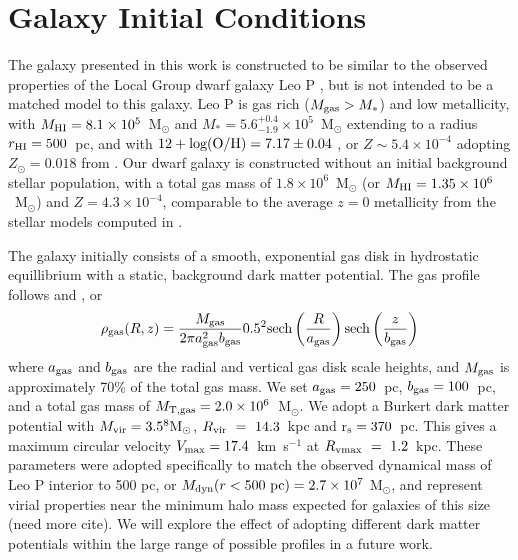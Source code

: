 \documentclass[twocolumn]{aastex61}
\begin{document}
\section{Galaxy Initial Conditions}
\label{sec:IC}
The galaxy presented in this work is constructed to be similar to the observed properties of the Local Group dwarf galaxy Leo P \citep{Giovanelli2013,McQuinn2013,McQuinn2015a,McQuinn2015}, but is not intended to be a matched model to this galaxy. Leo P is gas rich ($M_{\rm gas} > M_{*}$) and low metallicity, with $M_{\rm HI} = 8.1\times 10^{5}$~M$_{\odot}$ and $M_{*} = 5.6^{+0.4}_{-1.9} \times 10^{5}$~M$_{\odot}$ \citep{McQuinn2015a} extending to a radius $r_{\rm HI} = 500$~pc, and with $12 + \rm{log(O/H)} = 7.17 \pm 0.04$ \citep{Skillman2013}, or $Z \sim 5.4\times10^{-4}$ adopting $Z_{\odot} = 0.018$ from \citet{Asplund2009}. Our dwarf galaxy is constructed without an initial background stellar population, with a total gas mass of $1.8 \times 10^{6}$~M$_{\odot}$ (or $M_{\rm HI} = 1.35 \times 10^{6}$~M$_{\odot}$) and $Z = 4.3\times 10^{-4}$, comparable to the average $z = 0$ metallicity from the stellar models computed in \citep{McQuinn2015}.

The galaxy initially consists of a smooth, exponential gas disk in hydrostatic equillibrium with a static, background dark matter potential. The gas profile follows \citet{Tonnesen2009} and \citet{Salem2015}, or
\begin{equation}
\rho_{\rm gas} (R,z) = \frac{M_{\rm gas}}{2\pi a^2_{\rm gas}b_{\rm gas}} 0.5^2{\rm sech}\left(\frac{R}{a_{\rm gas}}\right){\rm sech}\left(\frac{z}{b_{\rm gas}}\right)
\end{equation}
where $a_{\rm gas}$ and $b_{\rm gas}$ are the radial and vertical gas disk scale heights, and $M_{\rm gas}$ is approximately 70\% of the total gas mass. We set $a_{\rm gas} = 250$~pc, $b_{\rm gas} = 100$~pc, and a total gas mass of $M_{\rm T,gas} = 2.0\times 10^6$~M$_{\odot}$. We adopt a Burkert \citet{Burkert1995} dark matter potential with $M_{\rm vir} = 3.5^{8} \rm{M_{\odot}}$, $R_{\rm vir}~=~14.3$~kpc and r$_{\rm s} = 370$~pc. This gives a maximum circular velocity $V_{\rm max} = 17.4$~km~s$^{-1}$ at $R_{\rm vmax}~=~1.2$~kpc. These parameters were adopted specifically to match the observed dynamical mass of Leo P interior to 500 pc, or $M_{\rm dyn} (r < 500~\rm{pc}) = 2.7\times 10^{7}$ M$_{\odot}$, and represent virial properties near the minimum halo mass expected for galaxies of this size \citep{Ferrero2012} (need more cite). We will explore the effect of adopting different dark matter potentials within the large range of possible profiles in a future work.
\end{document}
